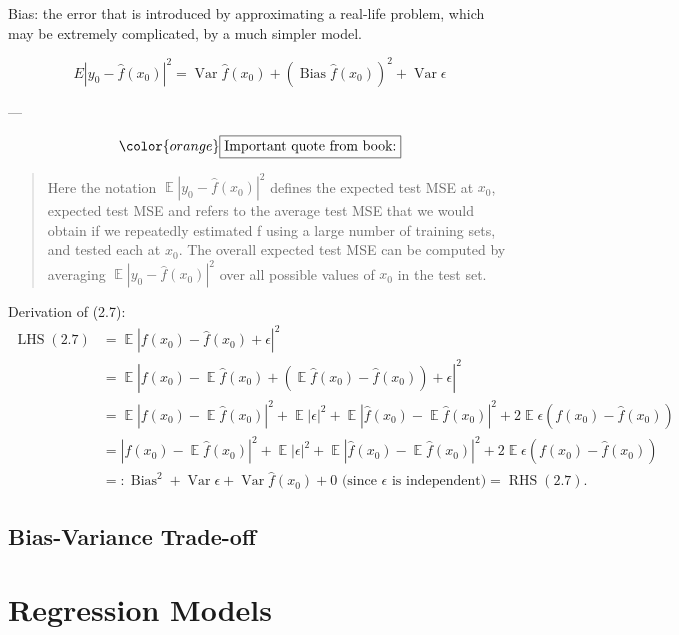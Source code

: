 \documentclass[11pt]{article}
\theoremstyle{definition}
\newcommand{\Var}{\operatorname{Var}}
\newcommand{\E}{\operatorname{\mathbb E}}
\newcommand{\Bias}{\operatorname{Bias}}
\begin{document}
Bias: the error that is introduced by approximating a real-life problem, which may be extremely complicated, by a much simpler model. 

\[ E|y_0 - \hat f(x_0)|^2 = \Var\hat f(x_0) + (\Bias \hat f(x_0))^2 + \Var\epsilon \tag{2.7} \]

---

$$\color{orange}\fbox{Important quote from book:}$$

\begin{quote} Here the notation $\E|y_0 - \hat f(x_0)|^2$ defines the expected test MSE at $x_0$, expected test MSE and refers to the average test MSE that we would obtain if we repeatedly estimated f using a large number of training sets, and tested each at $x_0$. The overall expected test MSE can be computed by averaging $\E|y_0 - \hat f(x_0)|^2$ over all possible values of $x_0$ in the test set. 	
\end{quote}

Derivation of (2.7): 
\begin{align*}
\operatorname{LHS}(2.7)
&=  \E|f(x_0) - \hat f(x_0) + \epsilon|^2 \\
&= \E|f(x_0) - \E \hat f(x_0) + (\E \hat f(x_0) - \hat f(x_0)) + \epsilon|^2 \\
&= \E|f(x_0) - \E\hat f(x_0)|^2 + \E|\epsilon|^2 + \E|\hat f(x_0) - \E\hat f(x_0)|^2 + 2\E\epsilon (f(x_0) - \hat f(x_0) ) \\
&= | f(x_0) - \E\hat f(x_0)|^2 + \E|\epsilon|^2 + \E|\hat f(x_0) - \E\hat f(x_0)|^2 + 2\E\epsilon (f(x_0) - \hat f(x_0) ) \\
&=: \Bias^2 + \Var\epsilon + \Var\hat f(x_0) + 0 \text{ (since }\epsilon\text{ is independent)} = \operatorname{RHS}(2.7).
\end{align*}

\subsection{Bias-Variance Trade-off}


\section{Regression Models}
\section{}
\section{}
\end{document}
